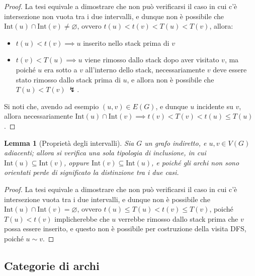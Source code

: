 \documentclass[14pt]{extreport}
\newtheorem{lemma}{Lemma}[subsection]
\theoremstyle{definition}
\theoremstyle{definition}
\begin{document}
\begin{proof}
    La tesi equivale a dimostrare che non può verificarsi il caso in cui c'è intersezione non vuota tra i due intervalli, e dunque non è possibile che $\mathrm{Int}(u) \cap \mathrm{Int}(v) \neq \varnothing$, ovvero $t(u) < t(v) < T(u) < T(v)$, allora:

    \begin{itemize}
        \item $t(u) < t(v) \implies u$ inserito nello stack prima di $v$
        \item $t(v) < T(u) \implies u$ viene rimosso dallo stack dopo aver visitato $v$, ma poiché $u$ era sotto a $v$ all'interno dello stack, necessariamente $v$ deve essere stato rimosso dallo stack prima di $u$, e allora non è possibile che $T(u) < T(v) \ \lightning$.
    \end{itemize}
    
    Si noti che, avendo ad esempio $(u, v) \in E(G)$, e dunque $u$ incidente su $v$, allora necessariamente $\mathrm{Int}(u) \cap \mathrm{Int}(v) \implies t(v) < T(v) < t(u) \le T(u)$.
\end{proof}

\begin{lemma}[Proprietà degli intervalli]
    Sia $G$ un grafo indiretto, e $u, v \in V(G)$ adiacenti; allora si verifica una sola tipologia di inclusione, in cui $\mathrm{Int}(u) \subseteq \mathrm{Int}(v)$, oppure $\mathrm{Int}(v) \subseteq \mathrm{Int}(u)$, e poiché gli archi non sono orientati perde di significato la distinzione tra i due casi.
\end{lemma}

\begin{proof}
    La tesi equivale a dimostrare che non può verificarsi il caso in cui c'è intersezione vuota tra i due intervalli, e dunque non è possibile che $\mathrm{Int}(u) \cap \mathrm{Int}(v) = \varnothing$, ovvero $t(u) \le T(u) < t(v) \le T(v)$, poiché $T(u) < t(v)$ implicherebbe che $u$ verrebbe rimosso dallo stack prima che $v$ possa essere inserito, e questo non è possibile per costruzione della visita DFS, poiché $u \sim v$.
\end{proof}

\subsection{Categorie di archi}
\end{document}
